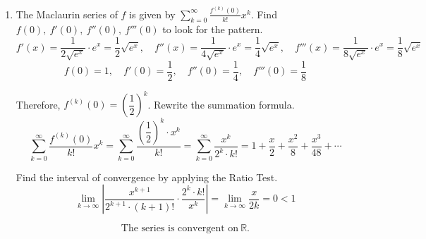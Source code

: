 \documentclass[a4paper, 12pt]{article}
\begin{document}
\begin{enumerate}[leftmargin=*,label=\textbf{\arabic*.}]
We can also take the limit inside the function because $\ln x$ is continuous on its domain.
\begin{align*}\ln(L)&=\lim_{n\to\infty}\ln\left[\left(\frac1n\right)^{1/n}\right]=\lim_{n\to\infty}\frac{\ln\left(\frac1n\right)}{n}\end{align*}

To be able to use L'Hôpital's rule, take the corresponding function $f(x)=\dfrac{\ln\left(\frac1x\right)}x$.
\[\lim_{x\to\infty}\frac{\ln\left(\frac1x\right)}x\overset{\text{L'H.}}{=}\lim_{x\to\infty}\frac{x\cdot\left(-\frac1{x^2}\right)}1=\lim_{x\to\infty}-\frac1x=0\implies \ln(L)=0\implies L=1\]

The limit $\displaystyle\lim_{n\to\infty}(-1)^{n+1}$ does not exist because of oscillation. So, $\displaystyle\lim_{n\to\infty}(-1)^{n+1}\left(\frac1n\right)^{1/n}$ does not exist either. Therefore, by the $n$th Term Test for divergence, the series $\displaystyle\sum_{n=1}^{\infty}(-1)^{n+1}\left(\frac1n\right)^{1/n}$ is $\boxed{\text{divergent}}$.

\item The Maclaurin series of $f$ is given by $\sum_{k=0}^{\infty}\frac{f^{(k)}(0)}{k!}x^k$. Find $f(0),\:f'(0),\:f''(0),\:f'''(0)$ to look for the pattern.
\[f'(x)=\frac1{2\sqrt{ e^x}}\cdot e^x=\frac12\sqrt{ e^x},\quad f''(x)=\frac1{4\sqrt{ e^x}}\cdot e^x=\frac14\sqrt{ e^x},\quad f'''(x)=\frac1{8\sqrt{ e^x}}\cdot e^x=\frac18\sqrt{ e^x}\]
\[f(0)=1,\quad f'(0)=\frac12,\quad f''(0)=\frac14,\quad f'''(0)=\frac18\]

Therefore, $f^{(k)}(0)=\left(\dfrac12\right)^k$. Rewrite the summation formula.
\[\sum_{k=0}^{\infty}\frac{f^{(k)}(0)}{k!}x^k=\sum_{k=0}^{\infty}\frac{\left(\dfrac12\right)^k\cdot x^k}{k!}=\boxed{\sum_{k=0}^{\infty}\frac{x^k}{2^k\cdot k!}=1+\frac{x}2+\frac{x^2}8+\frac{x^3}{48}+\cdots}\]

Find the interval of convergence by applying the Ratio Test.
\[\lim_{k\to\infty}\left|\frac{x^{k+1}}{2^{k+1}\cdot\left(k+1\right)!}\cdot\frac{2^k\cdot k!}{x^k}\right|=\lim_{k\to\infty}\frac{x}{2k}=0<1\]

\[\boxed{\text{The series is convergent on}\:\mathbb{R}.}\]

\end{enumerate}
\end{document}
